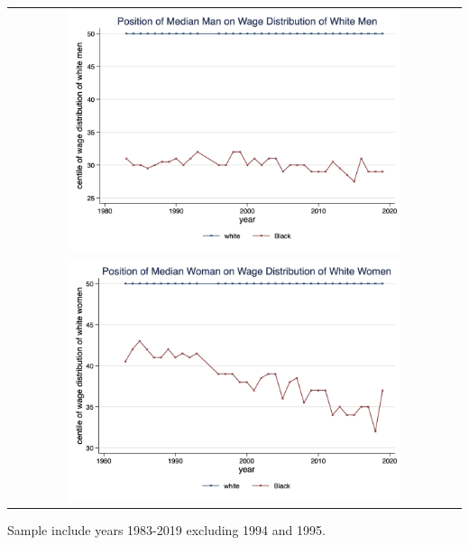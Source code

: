 \documentclass[11pt]{article}
\begin{document}
{\pagebreak
\begin{table}[h!]
    \centering
    \label{fig:med_centile_time}
    \begin{tabular}{c}
          \includegraphics[width = 0.75\textwidth, keepaspectratio]{figures/fin_med_centile_time_men.png} \\
          \includegraphics[width = 0.75\textwidth, keepaspectratio]{figures/fin_med_centile_time_women.png}
    \end{tabular}
\end{table}
\footnotesize{Sample include years 1983-2019 excluding 1994 and 1995.}

}
\end{document}
